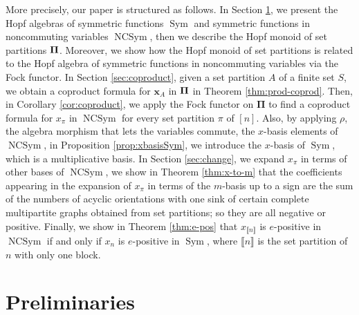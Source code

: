 \documentclass[12pt]{amsart}  %
\theoremstyle{definition}
\theoremstyle{remark}
\numberwithin{equation}{section}
\newcommand{\Sym}{\ensuremath{\operatorname{Sym}}}
\newcommand{\NCSym}{\ensuremath{\operatorname{NCSym}}}
\newcommand{\enc}{{e}}         	%
\newcommand{\mnc}{{m}}           	%
\newcommand{\xnc}{{x}}                 %
\newcommand{\xhm}{\mathbf{x}}
\newcommand{\bPi}{{\mathbf{\Pi}}}
\newcommand{\stn}{{\llbracket n \rrbracket}}
\newcommand\FA[1]{{\color{red}{#1}}}
\newcommand\svw[1]{{\color{black}{#1}}}
\begin{document}
More precisely, our paper is structured as follows. 
In Section \ref{sec:background}, we present the Hopf algebras of symmetric functions $\Sym$ and symmetric functions in noncommuting variables $\NCSym$, then we describe the Hopf monoid of set partitions ${\bf \Pi}$. Moreover, we show how the Hopf monoid of set partitions is related to the Hopf algebra of symmetric functions in noncommuting variables via the Fock functor. In Section \ref{sec:coproduct}, given a set partition $A$ of a finite set $S$, we obtain a coproduct formula for $\xhm_A$ in ${\bf \Pi}$ in Theorem \ref{thm:prod-coprod}. Then, in Corollary \ref{cor:coproduct}, we apply the Fock functor on $\bPi$ to find a coproduct formula for $\xnc_\pi$ in $\NCSym$ for every set partition $\pi$ of $[n]$. Also, by applying $\rho$, the algebra morphism that lets the variables commute, \svw{to} the $x$-basis elements of $\NCSym$, in Proposition \ref{prop:xbasisSym}, we introduce the $x$-basis of $\Sym$, which is a multiplicative basis. In Section \ref{sec:change}, we expand $\xnc_\pi$ in terms of other bases of $\NCSym$, \svw{in particular,} we show in Theorem \ref{thm:x-to-m} that the coefficients appearing in the expansion of $\xnc_\pi$ in terms of the $\mnc$-basis up to a sign are the sum of the numbers of acyclic orientations with one sink of certain complete multipartite graphs obtained from set partitions; so they are all negative or \svw{all} positive. Finally, we show in Theorem \ref{thm:e-pos} that $x_{\stn}$ is $\enc$-positive in $\NCSym$ if and only if $x_{n}$ is $e$-positive in $\Sym$, where $\llbracket n \rrbracket$ is the set partition of $n$ with only one block.

\section{Preliminaries}\label{sec:background}
%
%
%
%
%


 
\end{document}
